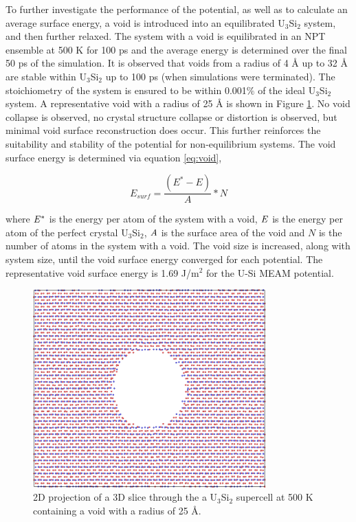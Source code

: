 \documentclass[review]{elsarticle}
\begin{document}
\FloatBarrier

To further investigate the performance of the potential, as well as to calculate an average surface energy, a void is introduced into an equilibrated U$_{3}$Si$_{2}$ system, and then further relaxed.  The system with a void is equilibrated in an NPT ensemble at 500 K for 100 ps and the average energy is determined over the final 50 ps of the simulation.  It is observed that voids from a radius of 4 {\AA} up to 32 {\AA} are stable within U$_{3}$Si$_{2}$ up to 100 ps (when simulations were terminated).   The stoichiometry of the system is ensured to be within 0.001$\%$ of the ideal U$_{3}$Si$_{2}$ system.  A representative void with a radius of 25 {\AA} is shown in Figure \ref{fig:void}.  No void collapse is observed, no crystal structure collapse or distortion is observed, but minimal void surface reconstruction does occur.  This further reinforces the suitability and stability of the potential for non-equilibrium systems.  The void surface energy is determined via equation \ref{eq:void},

\begin{equation}
\label{eq:void}
E_{surf}= \frac{(E^{*} - E)}{A} * N
\end{equation}

where $\it{E^{*}}$ is the energy per atom of the system with a void, $\it{E}$ is the energy per atom of the perfect crystal U$_{3}$Si$_{2}$, $\it{A}$ is the surface area of the void and $\textit{N}$ is the number of atoms in the system with a void.  The void size is increased, along with system size, until the void surface energy converged for each potential.  The representative void surface energy is 1.69 J/m$^{2}$ for the U-Si MEAM potential.

\begin{figure}[bt]
	\centering
	\includegraphics[width=0.8\textwidth]{void3.png}
    \caption{2D projection of a 3D slice through the a U$_{3}$Si$_{2}$ supercell at 500 K containing a void with a radius of 25 {\AA}.  }\label{fig:void}
\end{figure}
\end{document}
